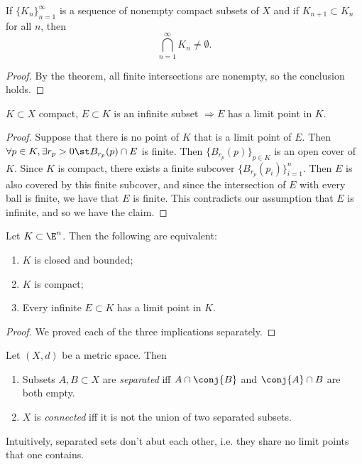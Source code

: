 \documentclass{notes}
\begin{document}
\begin{corollary}
  If $\{K_n\}^\infty_{n=1}$ is a sequence of nonempty compact subsets of $X$ and if $K_{n+1}\subset 
  K_n$ for all $n$, then $$\bigcap_{n=1}^\infty K_n \neq \emptyset.$$
\end{corollary}
\begin{proof}
  By the theorem, all finite intersections are nonempty, so the conclusion holds.
\end{proof}

\begin{corollary}
  $K\subset X$ compact, $E\subset K$ is an infinite subset $\Rightarrow E$ has a limit point in $K$.
\end{corollary}
\begin{proof}
  Suppose that there is no point of $K$ that is a limit point of $E$. Then $\forall p\in K, \exists
  r_p >0 \st B_{r_p}(p) \cap E$ is finite. Then $\{B_{r_p}(p)\}_{p\in K}$ is an open cover of $K$. 
  Since $K$ is compact, there exists a finite subcover $\{B_{r_p}(p_i)\}_{i=1}^n$. Then $E$ is also
  covered by this finite subcover, and since the intersection of $E$ with every ball is finite, we 
  have that $E$ is finite. This contradicts our assumption that $E$ is infinite, and so we have the claim.
\end{proof}

\begin{theorem}
  Let $K\subset\E^n$. Then the following are equivalent:
  \begin{enumerate}
    \item $K$ is closed and bounded;
    \item $K$ is compact;
    \item Every infinite $E\subset K$ has a limit point in $K$.  
  \end{enumerate}
\end{theorem}
\begin{proof}
  We proved each of the three implications separately.
\end{proof}

\begin{defn}
  Let $(X,d)$ be a metric space. Then 
  \begin{enumerate}
    \item Subsets $A,B\subset X$ are \emph{separated} iff $A \cap \conj{B}$ and $\conj{A} \cap B$ are
      both empty.
    \item $X$ is \emph{connected} iff it is not the union of two separated subsets.  
  \end{enumerate}
\end{defn}
Intuitively, separated sets don't abut each other, i.e. they share no limit points that one contains.
\end{document}
